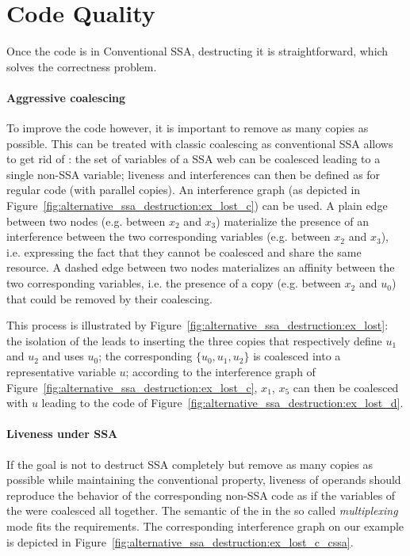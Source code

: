 \section{Code Quality}
Once the code is in Conventional SSA, destructing it is straightforward, which solves the correctness problem. 

\paragraph{Aggressive coalescing}
To improve the code however, it
is important to remove as many copies as possible. This can be treated
with classic coalescing as conventional SSA allows to get rid of \phifuns: the set of variables of a SSA web can be coalesced leading to a single non-SSA variable; liveness and
interferences can then be defined as for regular code (with parallel copies). An interference graph (as depicted in Figure~\ref{fig:alternative_ssa_destruction:ex_lost_c}) can be used. A plain edge between two nodes (e.g. between $x_2$ and $x_3$) materialize the presence of an interference between the two corresponding variables (e.g. between $x_2$ and $x_3$), i.e. expressing the fact that they cannot be coalesced and share the same resource. A dashed edge between two nodes materializes an affinity between the two corresponding variables, i.e. the presence of a copy (e.g. between $x_2$ and $u_0$) that could be removed by their coalescing.

This process is illustrated by Figure~\ref{fig:alternative_ssa_destruction:ex_lost}: the isolation of the \phifun leads to inserting the three copies that respectively define $u_1$ and $u_2$ and uses $u_0$; the corresponding \phiweb  $\{u_0, u_1, u_2\}$ is coalesced into a representative variable $u$; according to the interference graph of Figure~\ref{fig:alternative_ssa_destruction:ex_lost_c}, $x_1$, $x_5$ can then be coalesced with $u$ leading to the code of Figure~\ref{fig:alternative_ssa_destruction:ex_lost_d}.

\paragraph{Liveness under SSA}
If the goal is not to destruct SSA completely but remove as many copies as possible while maintaining the conventional property, liveness of \phifun operands should reproduce the behavior of the corresponding non-SSA code as if the variables of the \phiweb were coalesced all together. The semantic of the \phiop in the so called \emph{multiplexing} mode
fits the requirements. The corresponding interference graph on our example is depicted in Figure~\ref{fig:alternative_ssa_destruction:ex_lost_c_cssa}.


